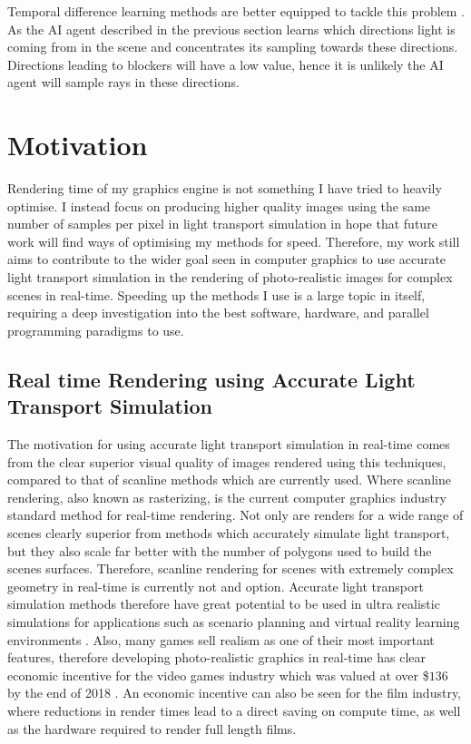 \documentclass[ %
                    author={Callum Pearce},
                supervisor={Dr. Neill Campbell},
                    degree={MEng},
                     title={How effective are Temporal difference learning methods for reducing the number of zero contribution light paths, while still accurately approximating Global Illumination in Path tracing?},
                  subtitle={},
                      type={research},
                      year={2019} ]{dissertation}
\begin{document}
Temporal difference learning methods are better equipped to tackle this problem 
\cite{dahm2017learning}. As the AI agent described in the previous section learns 
which directions light is coming from in the scene and concentrates its sampling 
towards these directions. Directions leading to blockers will have a low value, 
hence it is unlikely the AI agent will sample rays in these directions.\\

\section{Motivation}
\label{sec:motivation}

Rendering time of my graphics engine is not something I have tried to heavily 
optimise. I instead focus on producing higher quality images using the same 
number of samples per pixel in light transport simulation in hope that future 
work will find ways of optimising my methods for speed. Therefore, my work 
still aims to contribute to the wider goal seen in computer graphics to use 
accurate light transport simulation in the rendering of photo-realistic images 
for complex scenes in real-time.  Speeding up the methods I use is a large 
topic in itself, requiring a deep investigation into the best software, hardware, 
and parallel programming paradigms to use.\\

\subsection{Real time Rendering using Accurate Light Transport Simulation}
The motivation for using accurate light transport simulation in real-time 
comes from the clear superior visual quality of images rendered using this 
techniques, compared to that of scanline methods which are currently used. 
Where scanline rendering, also known as rasterizing, is the current computer 
graphics industry standard method for real-time rendering. Not only are 
renders for a wide range of scenes clearly superior from methods which 
accurately simulate light transport, but they also scale far better with the 
number of polygons used to build the scenes surfaces. Therefore, scanline 
rendering for scenes with extremely complex geometry in real-time is currently 
not and option. Accurate light transport simulation methods therefore have 
great potential to be used in ultra realistic simulations for applications such 
as scenario planning and virtual reality learning environments \cite{pan2006virtual}. 
Also, many games sell realism as one of their most important features, therefore 
developing photo-realistic graphics in real-time has clear economic incentive for 
the video games industry which was valued at over \$$136$ by the end of 2018 
\cite{bloomberg.com}. An economic incentive can also be seen for the film
industry, where reductions in render times lead to a direct saving on compute 
time, as well as the hardware required to render full length films.
\end{document}
